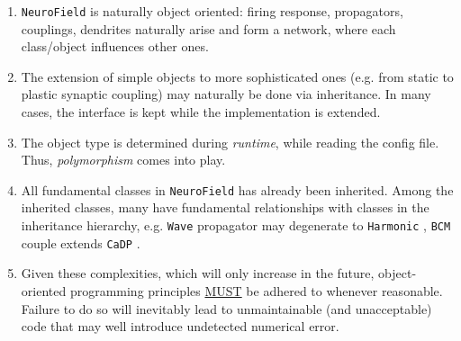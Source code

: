 \documentclass[12pt,a4paper]{article}
\newcommand{\type}[1]{{\small\small\tt #1} }
\newcommand{\NF}[0]{\type{NeuroField}}
\begin{document}
\begin{enumerate}
	\item \NF is naturally object oriented: firing response, propagators, couplings, dendrites naturally arise and form a network, where each class/object influences other ones.
	\item The extension of simple objects to more sophisticated ones (e.g. from static to plastic synaptic coupling) may naturally be done via inheritance. In many cases, the interface is kept while the implementation is extended.
	\item The object type is determined during \emph{runtime}, while reading the config file. Thus, \emph{polymorphism} comes into play.
	\item All fundamental classes in \NF has already been inherited. Among the inherited classes, many have fundamental relationships with classes in the inheritance hierarchy, e.g. \type{Wave} propagator may degenerate to \type{Harmonic}, \type{BCM} couple extends \type{CaDP}.
	\item Given these complexities, which will only increase in the future, object-oriented programming principles \underline{MUST} be adhered to whenever reasonable. Failure to do so will inevitably lead to unmaintainable (and unacceptable) code that may well introduce undetected numerical error.
\end{enumerate}
\end{document}
